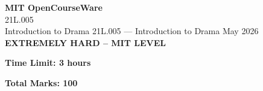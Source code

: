 \documentclass[12pt,a4paper]{exam}
\begin{document}
\begin{center}
{\LARGE \textbf{MIT OpenCourseWare}}\\21L.005\\Introduction to Drama
\vspace{0.5cm}
{21L.005} --- {Introduction to Drama}
\vspace{0.3cm}
May 2026
\vspace{0.3cm}
\textbf{EXTREMELY HARD -- MIT LEVEL}
\end{center}

\begin{center}
\textbf{Time Limit: 3 hours}
\end{center}

\begin{center}
\textbf{Total Marks: 100}
\end{center}

\vspace{0.5cm}
\end{document}
